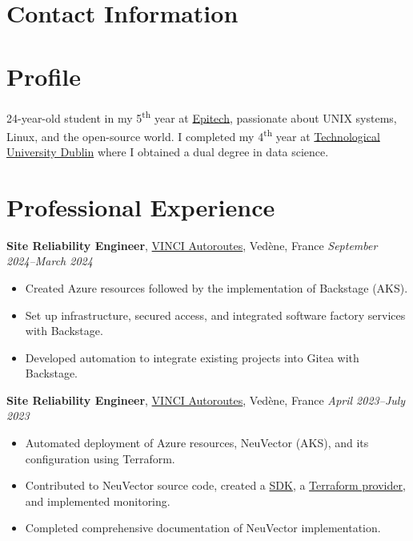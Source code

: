 \documentclass[margin,line]{../res}
\begin{document}
\newcommand{\myname}{Théo BORI}
\newlength{\mynamewidth}
\settowidth{\mynamewidth}{\namefont\myname}

\name{\hspace*{0.5\textwidth}\hspace{-0.5\mynamewidth} \myname \vspace*{.1in}}
\thispagestyle{empty}

\begin{resume}

	\section{\sc Contact Information}
	

	\vspace{-1em}

	\section{\sc Profile}
	24-year-old student in my 5\textsuperscript{th} year at \href{https://www.epitech.eu/}{Epitech}, passionate about UNIX systems, Linux, and the open-source world. I completed my 4\textsuperscript{th} year at \href{https://www.tudublin.ie/}{Technological University Dublin} where I obtained a dual degree in data science.

	\section{\sc Professional Experience}
	 {\bf Site Reliability Engineer}, \href{https://www.vinci-autoroutes.com}{VINCI Autoroutes}, Vedène, France
	\hfill {\it September 2024--March 2024}
	\vspace*{.05in}
	\begin{itemize}
		\item Created Azure resources followed by the implementation of Backstage (AKS).
		\item Set up infrastructure, secured access, and integrated software factory services with Backstage.
		\item Developed automation to integrate existing projects into Gitea with Backstage.
	\end{itemize}

	{\bf Site Reliability Engineer}, \href{https://www.vinci-autoroutes.com}{VINCI Autoroutes}, Vedène, France
	\hfill {\it April 2023--July 2023}
	\vspace*{.05in}
	\begin{itemize}
		\item Automated deployment of Azure resources, NeuVector (AKS), and its configuration using Terraform.
		\item Contributed to NeuVector source code, created a \href{https://github.com/theobori/go-neuvector}{SDK}, a \href{https://github.com/theobori/terraform-provider-neuvector}{Terraform provider}, and implemented monitoring.
		\item Completed comprehensive documentation of NeuVector implementation.
	\end{itemize}


\end{resume}
\end{document}
